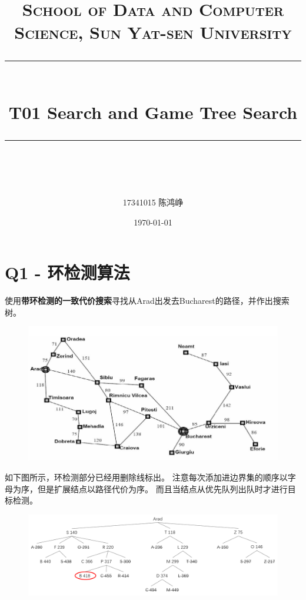 \documentclass[a4paper, 11pt]{article}
\title{	
\normalfont \normalsize
\textsc{School of Data and Computer Science, Sun Yat-sen University} \\ [25pt] %
\rule{\textwidth}{0.5pt} \\[0.4cm] %
\huge  T01 Search and Game Tree Search\\ %
\rule{\textwidth}{2pt} \\[0.5cm] %
\author{17341015 陈鸿峥}
\date{\normalsize\today}
}
\begin{document}
\maketitle
\tableofcontents
\newpage


\section{Q1 - 环检测算法}
\begin{question}
使用\textbf{带环检测的一致代价搜索}寻找从Arad出发去Bucharest的路径，并作出搜索树。
\begin{figure}[H]
\centering
\includegraphics[width=0.8\linewidth]{fig/map.png}
\end{figure}
\end{question}
\begin{answer}
如下图所示，环检测部分已经用删除线标出。
注意每次添加进边界集的顺序以字母为序，但是扩展结点以路径代价为序。
而且当结点从优先队列出队时才进行目标检测。
\begin{figure}[H]
\centering
\includegraphics[width=\linewidth]{fig/A1.png}
\end{figure}
\end{answer}
\end{document}
